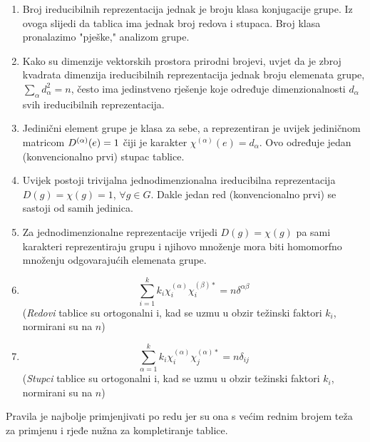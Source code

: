 \begin{enumerate}

\item Broj ireducibilnih reprezentacija jednak je broju klasa konjugacije 
  grupe. Iz ovoga slijedi da tablica ima jednak broj redova i stupaca. 
  Broj klasa pronalazimo "pješke," analizom grupe.

\item Kako su dimenzije vektorskih prostora prirodni brojevi,
    uvjet da je zbroj kvadrata dimenzija ireducibilnih reprezentacija
    jednak broju elemenata grupe, $\sum_{\alpha} d_{\alpha}^2 = n$, često ima jedinstveno rješenje koje
    određuje dimenzionalnosti $d_{\alpha}$ svih ireducibilnih reprezentacija.

\item Jedinični element grupe je klasa za sebe, a reprezentiran je uvijek
  jediničnom matricom $D^{(\alpha)}(e)=1$ čiji je 
   karakter $\chi^{(\alpha)}(e)=d_{\alpha}$.
  Ovo određuje jedan (konvencionalno prvi) stupac tablice.

\item Uvijek postoji trivijalna jednodimenzionalna ireducibilna
   reprezentacija  $D(g)=\chi(g)=1$, $\forall g\in G$.
  Dakle jedan red (konvencionalno prvi) se sastoji od samih jedinica.

\item Za jednodimenzionalne reprezentacije vrijedi $D(g)=\chi(g)$ pa
  sami karakteri reprezentiraju grupu i njihovo množenje mora biti
  homomorfno množenju odgovarajućih elemenata grupe.

\item  \[\sum_{i=1}^{k} k_{i} \chi^{(\alpha)}_{i} \chi^{(\beta) *}_{i} =
    n \delta^{\alpha\beta}\] 
(\emph{Redovi} tablice su ortogonalni i, kad se uzmu u obzir težinski
  faktori $k_i$, normirani su na $n$)

\item  \[\sum_{\alpha=1}^{k} k_{i} \chi^{(\alpha)}_{i} \chi^{(\alpha) *}_{j} =
    n \delta_{ij} \] 
(\emph{Stupci} tablice su ortogonalni i, kad se uzmu u obzir težinski
  faktori $k_i$, normirani su na $n$)

\end{enumerate}

Pravila je najbolje primjenjivati po redu jer su ona s većim rednim
brojem teža za primjenu i rjeđe nužna za kompletiranje tablice.


